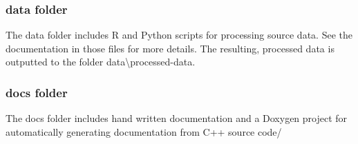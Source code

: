 \subsubsection*{{\ttfamily data} folder}

The {\ttfamily data} folder includes R and Python scripts for processing source data. See the documentation in those files for more details. The resulting, processed data is outputted to the folder {\ttfamily data\textbackslash{}processed-\/data}.

\subsubsection*{{\ttfamily docs} folder}

The {\ttfamily docs} folder includes hand written documentation and a Doxygen project for automatically generating documentation from C++ source code/ 